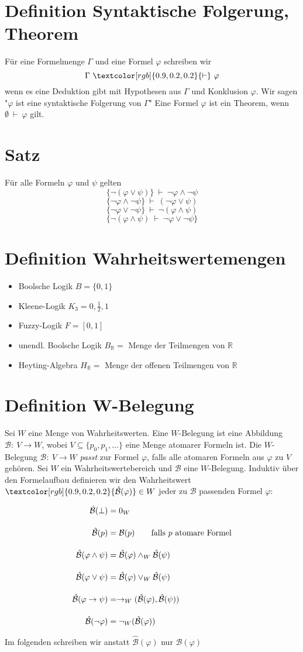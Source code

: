 \documentclass[12pt,a4paper]{report}
\newcommand{\ra}{\rightarrow}
\newcommand{\real}{\mathbb{R}}
\newcommand{\ls}{\newline\newline}
\newcommand{\logicand}{\wedge}
\newcommand{\logicor}{\vee}
\newcommand{\define}[1]{\section{\blue{Definition #1}}}
\newcommand{\satz}[1]{\section{\green{Satz #1}}}
\newcommand{\red}[1]{\textcolor[rgb]{0.9,0.2,0.2}{#1}}
\newcommand{\green}[1]{\textcolor[rgb]{0.1,0.6,0.1}{#1}}
\newcommand{\blue}[1]{\textcolor[rgb]{0.2,0.2,1}{#1}}
\begin{document}
\define{Syntaktische Folgerung, Theorem}
Für eine Formelmenge $ \Gamma $ und eine Formel $ \varphi $ schreiben wir
\[
    \Gamma ~\red \vdash ~\varphi
\]
wenn es eine Deduktion gibt mit Hypothesen aus $ \Gamma $ und Konklusion $ \varphi $. Wir sagen "$ \varphi $ ist eine \red{syntaktische Folgerung} von $ \Gamma $"\ls
Eine Formel $ \varphi $ ist ein \red{Theorem}, wenn $ \emptyset ~ \vdash ~ \varphi $ gilt.
\satz{}
Für alle Formeln $ \varphi $ und $ \psi $ gelten
\[
    \{\lnot (\varphi \logicor \psi)\} ~ \vdash ~ \lnot \varphi \logicand \lnot \psi
\]
\[
    \{\lnot \varphi \logicand \lnot \psi \}~ \vdash ~ (\lnot \varphi \vee \psi)
\]
\[
    \{\lnot \varphi \vee \lnot \psi\} ~ \vdash ~ \lnot(\varphi \wedge \psi)
\]
\[
    \{\lnot (\varphi \wedge \psi) ~\vdash~ \lnot \varphi \vee \lnot \psi\}
\]
\define{Wahrheitswertemengen}
\begin{itemize}
    \item \red{Boolsche Logik} $ B = \{0,1\} $
    \item \red{Kleene-Logik} $ K_3 = {0,\frac{ 1 }{ 2 } , 1} $
    \item \red{Fuzzy-Logik} $ F = [0,1] $
    \item \red{unendl. Boolsche Logik} $ B_\real =  $ Menge der Teilmengen von $ \real $
    \item \red{Heyting-Algebra} $ H_\real =$ Menge der offenen Teilmengen von $ \real $
\end{itemize}
\define{W-Belegung}
Sei $ W $ eine Menge von Wahrheitswerten. Eine \red{$W $-Belegung} ist eine Abbildung $ \mathcal{B}:~ V \ra W $, wobei $ V \subseteq \{p_0, p_1,\dots\} $ eine Menge atomarer Formeln ist.\ls
Die $ W $-Belegung $ \mathcal{B}:~ V \ra W $ \red{\textit{passt}} zur Formel $ \varphi $, falls alle atomaren Formeln aus $ \varphi $ zu $ V $ gehören.\ls
Sei $ W $ ein Wahrheitswertebereich und $\mathcal{B}$ eine $ W $-Belegung. Induktiv über den Formelaufbau definieren wir den Wahrheitswert $ \red{\hat{\mathcal{B}}(\varphi)} \in W  $ jeder zu $ \mathcal{B} $ passenden Formel $ \varphi  $:
\begin{center}
    \begin{align*}
        \hat{\mathcal{B}}(\perp) &= 0_W\\[1em]
        \hat{\mathcal{B}}(p) &= \mathcal{B}(p) \qquad \textnormal{falls $ p $ atomare Formel}\\[1em]
        \hat{\mathcal{B}}(\varphi \wedge \psi) &= \hat{\mathcal{B}}(\varphi) \wedge_W \hat{\mathcal{B}}(\psi)\\[1em]
        \hat{\mathcal{B}}(\varphi \vee\psi) &= \hat{\mathcal{B}}(\varphi) \vee_W \hat{\mathcal{B}}(\psi)\\[1em]
        \hat{\mathcal{B}}(\varphi\ra \psi) &= \ra_W(\hat{\mathcal{B}}(\varphi),\hat{\mathcal{B}}(\psi))\\[1em]
        \hat{\mathcal{B}}(\lnot\varphi) & = \lnot_W(\hat{\mathcal{B}}(\varphi))
    \end{align*}
\end{center}
Im folgenden schreiben wir anstatt $ \hat{\mathcal{B}}(\varphi) $ nur $ \mathcal{B}(\varphi) $
\end{document}
